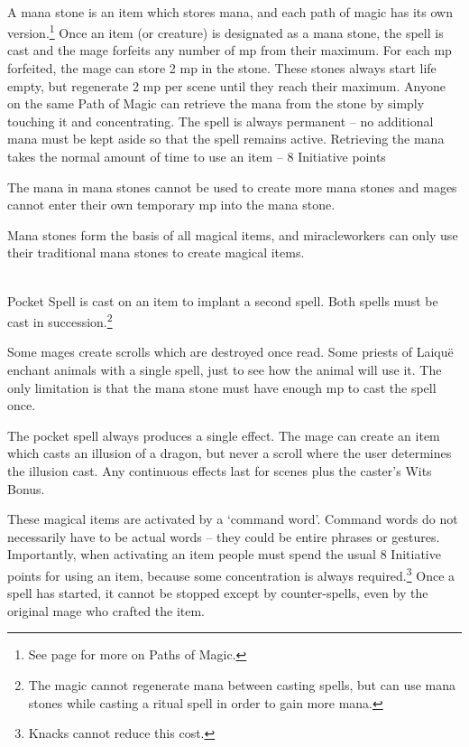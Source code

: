 \begin{multicols}{2}
\\
A mana stone is an item which stores mana, and each path of magic has its own version.\footnote{See page \pageref{magic_paths} for more on Paths of Magic.}
Once an item (or creature) is designated as a mana stone, the spell is cast and the mage forfeits any number of \gls{mp} from their maximum.
For each \gls{mp} forfeited, the mage can store 2 \gls{mp} in the stone.
These stones always start life empty, but regenerate 2 \gls{mp} per scene until they reach their maximum.
Anyone on the same Path of Magic can retrieve the mana from the stone by simply touching it and concentrating.
The spell is always permanent -- no additional mana must be kept aside so that the spell remains active.
Retrieving the mana takes the normal amount of time to use an item -- 8 Initiative points

The mana in mana stones cannot be used to create more mana stones and mages cannot enter their own temporary \gls{mp} into the mana stone.

Mana stones form the basis of all magical items, and \glspl{miracleworker} can only use their traditional mana stones to create magical items.

\spelllevel

\\
Pocket Spell is cast on an item to implant a second spell.
Both spells must be cast in succession.\footnote{The magic cannot regenerate mana between casting spells, but can use mana stones while casting a ritual spell in order to gain more mana.}

Some mages create scrolls which are destroyed once read.  Some priests of Laiqu\"{e} enchant animals with a single spell, just to see how the animal will use it.
The only limitation is that the mana stone must have enough \gls{mp} to cast the spell once.

The pocket spell always produces a single effect.
The mage can create an item which casts an illusion of a dragon, but never a scroll where the user determines the illusion cast.
Any continuous effects last for  scenes plus the caster's Wits Bonus.

These magical items are activated by a `command word'.
Command words do not necessarily have to be actual words -- they could be entire phrases or gestures.
Importantly, when activating an item people must spend the usual 8 Initiative points for using an item, because some concentration is always required.\footnote{Knacks cannot reduce this cost.}
Once a spell has started, it cannot be stopped except by counter-spells, even by the original mage who crafted the item.


\end{multicols}
